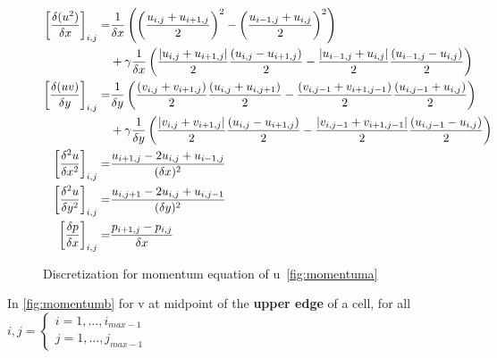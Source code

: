\documentclass[a4paper,11pt]{scrartcl}
\DeclarePairedDelimiter\abs{\lvert}{\rvert}
\begin{document}
\begin{figure}[H]
	\centering
	\begin{align*}
	 	\left[ \frac{\delta(u^2)}{\delta x}\right]_{i,j} =& \frac{1}{\delta x}\left( \left(\frac{u_{i,j} + u_{i+1,j}}{2} \right)^2 - \left(\frac{u_{i-1,j} + u_{i,j}}{2}\right)^2 \right) \\ &+ \gamma\frac{1}{\delta x} \left( \frac{\abs{u_{i,j} +u_{i+1,j}}}{2} \frac{(u_{i,j} - u_{i+1,j})}{2} - \frac{\abs{u_{i-1,j} + u_{i,j}}}{2} \frac{(u_{i-1,j} - u_{i,j})}{2} \right) \\		
	 	\left[ \frac{\delta(uv)}{\delta y}\right]_{i,j} =& \frac{1}{\delta y} \left( \frac{(v_{i,j} + v_{i+1,j})}{2} \frac{(u_{i,j} + u_{i,j+1})}{2} - \frac{(v_{i,j-1} + v_{i+1,j-1})}{2} \frac{(u_{i,j-1} + u_{i,j})}{2} \right) \\ &+ \gamma \frac{1}{\delta y}  \left( \frac{\abs{v_{i,j} + v_{i+1,j}}}{2} \frac{(u_{i,j} - u_{i+1,j})}{2} - \frac{\abs{v_{i,j-1} + v_{i+1,j-1}}}{2} \frac{(u_{i,j-1} - u_{i,j})}{2} \right) \\
	 	\left[ \frac{\delta^2 u}{\delta x^2}\right]_{i,j} =& \frac{u_{i+1, j} - 2u_{i,j} + u_{i-1,j}}{(\delta x)^2} \\
	 	\left[ \frac{\delta^2 u}{\delta y^2}\right]_{i,j} =& \frac{u_{i, j+1} - 2u_{i,j}  +u_{i,j-1}}{(\delta y)^2} \\
	 	\left[ \frac{\delta p}{\delta x}\right]_{i,j} =& \frac{p_{i+1,j} - p_{i,j}}{\delta x}
	\end{align*}
	
	\renewcommand{\thefigure}{3.19a}
	\caption{Discretization for momentum equation of u~\ref{fig:momentuma}}
	\label{fig:disc-moma}
\end{figure}


In \ref{fig:momentumb} for v at midpoint of the \textbf{upper edge} of a cell, for all $i,j = \begin{cases}
i = 1, \dots, i_{max-1} \\
j = 1, \dots, j_{max-1}
\end{cases}$
\end{document}
